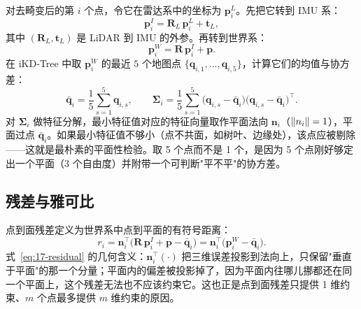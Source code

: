 对去畸变后的第 $i$ 个点，令它在雷达系中的坐标为 $\bm{p}_i^{L}$。先把它转到 IMU 系：
\begin{equation}\label{eq:17-extrinsic}
  \bm{p}_i^{I}=\bm{R}_L\,\bm{p}_i^{L}+\bm{t}_L,
\end{equation}
其中 $(\bm{R}_L,\bm{t}_L)$ 是 LiDAR 到 IMU 的外参。再转到世界系：
\begin{equation}\label{eq:17-world}
  \bm{p}_i^{W}=\bm{R}\,\bm{p}_i^{I}+\bm{p}.
\end{equation}
在 iKD-Tree 中取 $\bm{p}_i^{W}$ 的最近 $5$ 个地图点 $\{\bm{q}_{i,1},\dots,\bm{q}_{i,5}\}$，计算它们的均值与协方差：
\begin{equation}\label{eq:17-planefit}
  \bar{\bm{q}}_i=\frac15\sum_{s=1}^{5}\bm{q}_{i,s},\qquad
  \bm{\Sigma}_i=\frac15\sum_{s=1}^{5}\bigl(\bm{q}_{i,s}-\bar{\bm{q}}_i\bigr)\bigl(\bm{q}_{i,s}-\bar{\bm{q}}_i\bigr)^{\top}.
\end{equation}
对 $\bm{\Sigma}_i$ 做特征分解，最小特征值对应的特征向量取作平面法向 $\bm{n}_i$（$\left\lVert n_i \right\rVert=1$），平面过点 $\bar{\bm{q}}_i$。如果最小特征值不够小（点不共面，如树叶、边缘处），该点应被剔除——这就是最朴素的平面性检验。取 5 个点而不是 1 个，是因为 5 个点刚好够定出一个平面（3 个自由度）并附带一个可判断"平不平"的协方差。

\subsection{残差与雅可比}

点到面残差定义为世界系中点到平面的有符号距离：
\begin{equation}\label{eq:17-residual}
  r_i=\bm{n}_i^{\top}\bigl(\bm{R}\,\bm{p}_i^{I}+\bm{p}-\bar{\bm{q}}_i\bigr)
  =\bm{n}_i^{\top}\bigl(\bm{p}_i^{W}-\bar{\bm{q}}_i\bigr).
\end{equation}
式~\eqref{eq:17-residual} 的几何含义：$\bm{n}_i^{\top}(\cdot)$ 把三维误差投影到法向上，只保留"垂直于平面"的那一个分量；平面内的偏差被投影掉了，因为平面内往哪儿挪都还在同一个平面上，这个残差无法也不应该约束它。这也正是点到面残差只提供 1 维约束、$m$ 个点最多提供 $m$ 维约束的原因。

